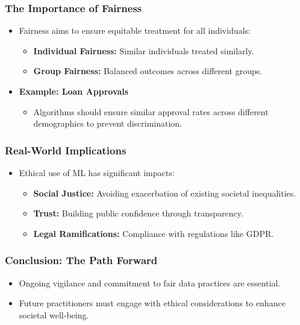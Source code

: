 \documentclass[aspectratio=169]{beamer}
\begin{document}
\begin{frame}[fragile]
    \frametitle{The Importance of Fairness}
    \begin{itemize}
        \item Fairness aims to ensure equitable treatment for all individuals:
            \begin{itemize}
                \item \textbf{Individual Fairness:} Similar individuals treated similarly.
                \item \textbf{Group Fairness:} Balanced outcomes across different groups.
            \end{itemize}
        \item \textbf{Example: Loan Approvals}
            \begin{itemize}
                \item Algorithms should ensure similar approval rates across different demographics to prevent discrimination.
            \end{itemize}
    \end{itemize}
\end{frame}

\begin{frame}[fragile]
    \frametitle{Real-World Implications}
    \begin{itemize}
        \item Ethical use of ML has significant impacts:
            \begin{itemize}
                \item \textbf{Social Justice:} Avoiding exacerbation of existing societal inequalities.
                \item \textbf{Trust:} Building public confidence through transparency.
                \item \textbf{Legal Ramifications:} Compliance with regulations like GDPR.
            \end{itemize}
    \end{itemize}
\end{frame}

\begin{frame}[fragile]
    \frametitle{Conclusion: The Path Forward}
    \begin{itemize}
        \item Ongoing vigilance and commitment to fair data practices are essential.
        \item Future practitioners must engage with ethical considerations to enhance societal well-being.
    \end{itemize}
\end{frame}
\end{document}

